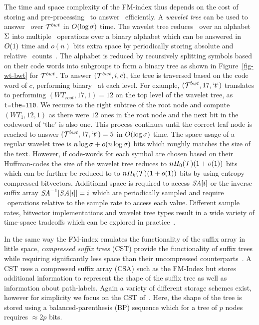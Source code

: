 The time and space complexity of the FM-index thus depends on the cost of storing
and pre-processing \colbwt\ to answer \rankop\ efficiently. A {\it wavelet tree}
can be used to answer \rankop\ over $\mathcal{T}^{bwt}$ in $O(\log \sigma)$ time.
The wavelet tree reduces \rankop\ over an alphabet $\Sigma$ into multiple
\rankop\ operations over a binary alphabet which can be answered 
in $O(1)$ time and $o(n)$ bits extra space by periodically storing absolute
and relative \rankop\ counts~\cite{m-fsttcs96}. The alphabet is
reduced by recursively splitting symbols based on their code words into subgroups to 
form a binary tree as shown in Figure~\ref{fig-wt-bwt} for $\mathcal{T}^{bwt}$. To answer
\rankop$(\mathcal{T}^{bwt},i,c)$, the tree is traversed based on the code word of $c$, performing
binary \rankop\ at each level. For example, \rankop$(\mathcal{T}^{bwt},17,`t`)$ translates
to performing \rankop$(WT_{root},17,1)=12$ on the top level of the wavelet 
tree, as {\tt t=the=110}. We recurse to the right subtree of the root node and
compute \rankop$(WT_{1},12,1)$ as there were $12$ ones in the root node and
the next bit in the codeword of `the' is also one. This process continues until 
the correct leaf node is reached to answer \rankop$(\mathcal{T}^{bwt},17,`t`)=5$ in 
$O(\log \sigma)$ time. The space usage of a regular wavelet tree is
$n \log \sigma + o(n \log \sigma)$ bits which roughly
matches the size of the text. However, if code-words for each symbol are chosen
based on their Huffman-codes the size of the wavelet tree reduces to $nH_0(\mathcal{T})(1 + o(1))$
bits which can be further be reduced to to $nH_k(\mathcal{T})(1 + o(1))$ bits by using 
entropy compressed bitvectors. Additional space is required to access $\mbox{\emph{SA}}[i]$
or the inverse suffix array $\mbox{\emph{SA}}^{-1}[SA[i]]=i$ which are periodically sampled
and require \rankop\ operations relative to the sample rate to access each value.
Different sample rates, bitvector implementations and wavelet tree types result
in a wide variety of time-space tradeoffs which can be explored 
in practice~\cite{gbmp2014sea}.

In the same way the FM-index emulates the functionality of the suffix array in
little space, {\it compressed suffix trees} (CST) provide the functionality
of suffix trees while requiring significantly less space than their uncompressed
counterparts~\cite{ofg-spire10}. A CST uses a compressed suffix array (CSA) such
as the FM-Index but stores additional information to represent the shape of
the suffix tree as well as information about path-labels. Again a variety
of different storage schemes exist, however for simplicity we focus on
the CST of~. Here, the shape of the tree
is stored using a balanced-parenthesis (BP) sequence which for a tree of $p$ nodes
requires $\approx 2p$ bits.
